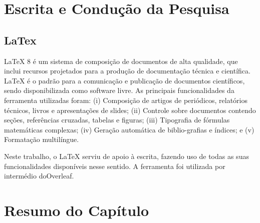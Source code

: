 \section{Escrita e Condução da Pesquisa}

\subsection{LaTex}
LaTeX 8 é um sistema de composição de documentos de alta qualidade, que inclui recursos projetados para a produção de documentação técnica e científica. LaTeX é o padrão para a comunicação e publicação de documentos científicos, sendo disponibilizada como software livre. As principais funcionalidades da ferramenta utilizadas foram:
(i) Composição de artigos de periódicos, relatórios técnicos, livros e apresentações de slides;
(ii) Controle sobre documentos contendo seções, referências cruzadas, tabelas e figuras;
(iii) Tipografia de fórmulas matemáticas complexas; (iv) Geração automática de biblio-grafias e índices; e (v) Formatação multilíngue.

Neste trabalho, o LaTeX serviu de apoio à escrita, fazendo uso de todas as suas funcionalidades disponíveis nesse sentido. A ferramenta foi utilizada por intermédio doOverleaf.
\section{Resumo do Capítulo}

